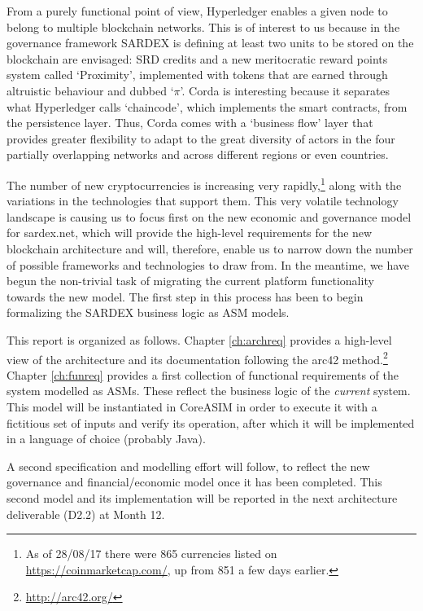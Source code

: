 From a purely functional point of view, Hyperledger enables a given node to belong to multiple blockchain networks. This is of interest to us because in the governance framework SARDEX is defining at least two units to be stored on the blockchain are envisaged: SRD credits and a new meritocratic reward points system called `Proximity', implemented with tokens that are earned through altruistic behaviour and dubbed `$\pi$'. Corda is interesting because it separates what Hyperledger calls `chaincode', which implements the smart contracts, from the persistence layer. Thus, Corda comes with a `business flow' layer that provides greater flexibility to adapt to the great diversity of actors in the four partially overlapping networks and across different regions or even countries.

The number of new cryptocurrencies is increasing very rapidly,\footnote{As of 28/08/17 there were 865 currencies listed on \url{https://coinmarketcap.com/}, up from 851 a few days earlier.} along with the variations in the technologies that support them. This very volatile technology landscape is causing us to focus first on the new economic and governance model for sardex.net, which will provide the high-level requirements for the new blockchain architecture and will, therefore, enable us to narrow down the number of possible frameworks and technologies to draw from. In the meantime, we have begun the non-trivial task of migrating the current platform functionality towards the new model. The first step in this process has been to begin formalizing the SARDEX business logic as ASM models.

This report is organized as follows. Chapter \ref{ch:archreq} provides a high-level view of the architecture and its documentation following the arc42 method.\footnote{\url{http://arc42.org/}} Chapter \ref{ch:funreq} provides a first collection of functional requirements of the system modelled as ASMs. These reflect the business logic of the \emph{current} system. This model will be instantiated in CoreASIM in order to execute it with a fictitious set of inputs and verify its operation, after which it will be implemented in a language of choice (probably Java).

A second specification and modelling effort will follow, to reflect the new governance and financial/economic model once it has been completed. This second model and its implementation will be reported in the next architecture deliverable (D2.2) at Month 12.











